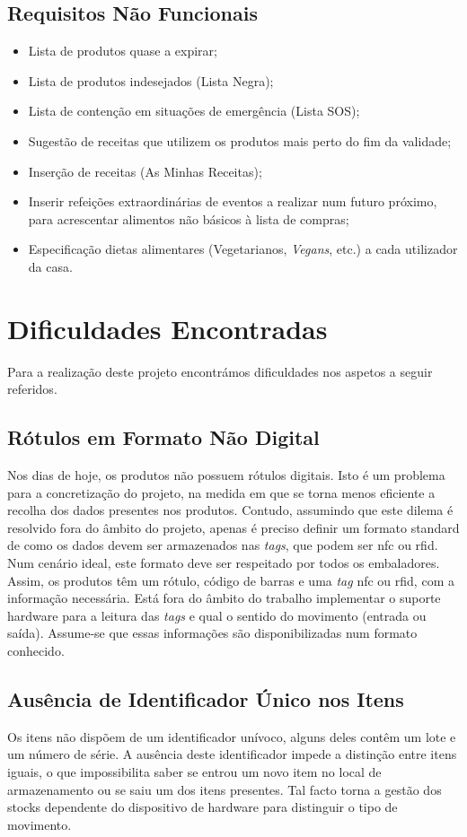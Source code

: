 \subsection{Requisitos Não Funcionais}
\begin{itemize}
	\item Lista de produtos quase a expirar;
	\item Lista de produtos indesejados (Lista Negra);
	\item Lista de contenção em situações de emergência (Lista SOS);
	\item Sugestão de receitas que utilizem os produtos mais perto do fim da validade;
	\item Inserção de receitas (As Minhas Receitas);
	\item Inserir refeições extraordinárias de eventos a realizar num futuro próximo, para acrescentar alimentos não básicos à lista de compras;
	\item Especificação dietas alimentares (Vegetarianos, \textit{Vegans}, etc.) a cada utilizador da casa.
\end{itemize}


%
%
\section{Dificuldades Encontradas} \label{sec23}

Para a realização deste projeto encontrámos dificuldades nos aspetos a seguir referidos.

\subsection{Rótulos em Formato Não Digital}

Nos dias de hoje, os produtos não possuem rótulos digitais. Isto é um problema para a concretização do projeto, na medida em que se torna menos eficiente a recolha dos dados presentes nos produtos. Contudo, assumindo que este dilema é resolvido fora do âmbito do projeto, apenas é preciso definir um formato standard de como os dados devem ser armazenados nas \textit{tags}, que podem ser \acrshort{nfc} ou \acrshort{rfid}. Num cenário ideal, este formato deve ser respeitado por todos os embaladores. Assim, os produtos têm um rótulo, código de barras e uma \textit{tag} \acrshort{nfc} ou \acrshort{rfid}, com a informação necessária. Está fora do âmbito do trabalho implementar o suporte hardware para a leitura das \textit{tags} e qual o sentido do movimento (entrada ou saída). Assume-se que essas informações são disponibilizadas num formato conhecido. 


\subsection{Ausência de Identificador Único nos Itens}

Os itens não dispõem de um identificador unívoco, alguns deles contêm um lote e um número de série. A ausência deste identificador impede a distinção entre itens iguais, o que impossibilita saber se entrou um novo item no local de armazenamento ou se saiu um dos itens presentes. Tal facto torna a gestão dos stocks dependente do dispositivo de hardware para distinguir o tipo de movimento.